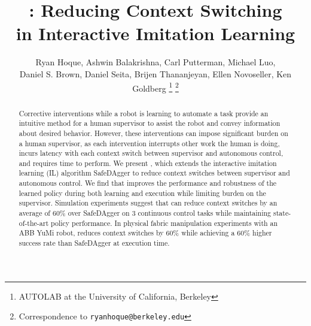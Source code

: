 \documentclass[letterpaper, 10 pt, conference]{ieeeconf}  %
\title{\LARGE \bf
\algname: Reducing Context Switching\\ in Interactive Imitation Learning
}
\author{
Ryan Hoque, Ashwin Balakrishna, Carl Putterman, Michael Luo, \\Daniel S. Brown, Daniel Seita, Brijen Thananjeyan, Ellen Novoseller, Ken Goldberg
\thanks{AUTOLAB at the University of California, Berkeley}
\thanks{Correspondence to {\tt\small ryanhoque@berkeley.edu}}
}
\renewcommand{\bibfont}{\small}
\begin{document}

\maketitle

\begin{abstract}
Corrective interventions while a robot is learning to automate a task provide an intuitive method for a human supervisor to assist the robot and convey information about desired behavior. However, these interventions can impose significant burden on a human supervisor, as each intervention interrupts other work the human is doing, incurs latency with each context switch between supervisor and autonomous control, and requires time to perform. We present \algname, which extends the interactive imitation learning (IL) algorithm SafeDAgger to reduce context switches between supervisor and autonomous control.
We find that \algname improves the performance and robustness of the learned policy during both learning and execution while limiting burden on the supervisor. Simulation experiments suggest that \algabbr can reduce context switches by an average of 60\% over SafeDAgger on 3 continuous control tasks while maintaining state-of-the-art policy performance. In physical fabric manipulation experiments with an ABB YuMi robot, \algname reduces context switches by 60\% while achieving a 60\% higher success rate than SafeDAgger at execution time. %

\end{abstract}










\renewcommand{\bibfont}{\footnotesize}

\printbibliography
% 
% 
\clearpage

\end{document}
